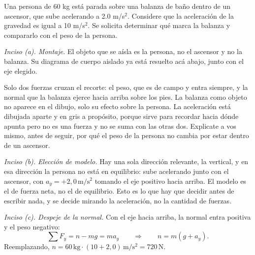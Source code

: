 \documentclass[11pt,openany]{book}
\begin{document}
\begin{ejemplo}[completo]
Una persona de 60 kg está parada sobre una balanza de baño dentro de un ascensor, que sube acelerando a 2.0 m/s$^2$. Considere que la aceleración de la gravedad es igual a 10 m/s$^2$. Se solicita determinar qué marca la balanza y compararlo con el peso de la persona.

\medskip
\textit{Inciso (a). Montaje.} El objeto que se aísla es la persona, no el ascensor y no la balanza. Su diagrama de cuerpo aislado ya está resuelto acá abajo, junto con el eje elegido.

\begin{center}
\end{center}

Solo dos fuerzas cruzan el recorte: el peso, que es de campo y entra siempre, y la normal que la balanza ejerce hacia arriba sobre los pies. La balanza como objeto no aparece en el dibujo, solo su efecto sobre la persona. La aceleración está dibujada aparte y en gris a propósito, porque sirve para recordar hacia dónde apunta pero no es una fuerza y no se suma con las otras dos. Explicate a vos mismo, antes de seguir, por qué el peso de la persona no cambia por estar dentro de un ascensor.

\medskip
\textit{Inciso (b). Elección de modelo.} Hay una sola dirección relevante, la vertical, y en esa dirección la persona no está en equilibrio: sube acelerando junto con el ascensor, con $a_y = +2{,}0\,\mathrm{m/s^2}$ tomando el eje positivo hacia arriba. El modelo es el de fuerza neta, no el de equilibrio. Esto es lo que hay que decidir antes de escribir nada, y se decide mirando la aceleración, no la cantidad de fuerzas.

\medskip
\textit{Inciso (c). Despeje de la normal.} Con el eje hacia arriba, la normal entra positiva y el peso negativo:
\[
\sum F_y = n - mg = ma_y
\qquad\Longrightarrow\qquad
n = m(g + a_y).
\]
Reemplazando, $n = 60\,\mathrm{kg} \cdot (10 + 2{,}0)\,\mathrm{m/s^2} = 720\,\mathrm{N}$.


\end{ejemplo}
\end{document}
